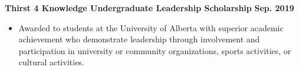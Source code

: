 \documentclass{article}
\begin{document}

\textbf{Thirst 4 Knowledge Undergraduate Leadership Scholarship} \hfill \textbf{Sep. 2019}
    \begin{itemize}
        \item Awarded to students at the University of Alberta with superior academic achievement who demonstrate leadership through involvement and participation in university or community organizations, sports activities, or cultural activities.
    \end{itemize}

\end{document}
